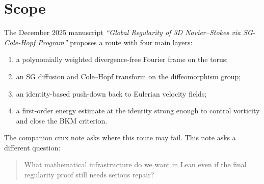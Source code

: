 \documentclass[11pt]{article}
\theoremstyle{remark}
\begin{document}
\begin{abstract}
one explicit object.  And the newest concrete step lands the D.4 chart side in
an actual finite-mode model: a squared weighted chart radius, a bounded linear
observable, the chart-cutoff datum \(W_0 = \chi \cdot \ell\), the heat datum
\(\phi = \exp(-W_0/(2\nu))\), explicit \(W_0/\phi\) bounds, and truncation
convergence for both \(W_0\) and \(\phi\) are now machine-checked in one local
module.  The latest pass then packages the first genuinely Cole--Hopf-shaped
shared truncation instance into direct named kernel and vorticity objects, so
the cutoff-convergence and uniform vorticity consequences can now be cited from
one concrete package instead of from the whole abstraction stack.  The newest
step then replaces the static selected-coefficient \(d\Phi\) surrogate by a
nonnegative-time heat-decayed one, while preserving the same shared
truncation, positivity, and coefficient-energy consequences.

This does \emph{not} prove 3D Navier--Stokes regularity.  What it does is make
the positive architecture cleaner: if the hard analytic bridges can be supplied,
the identity-energy argument now lands in a small Lean-checked interface rather
than in manuscript prose alone.
\end{abstract}

\tableofcontents

\section{Scope}

The December 2025 manuscript
\emph{``Global Regularity of 3D Navier--Stokes via SG-Cole-Hopf Program''}
proposes a route with four main layers:
\begin{enumerate}[leftmargin=1.5em]
  \item a polynomially weighted divergence-free Fourier frame on the torus;
  \item an SG diffusion and Cole--Hopf transform on the diffeomorphism group;
  \item an identity-based push-down back to Eulerian velocity fields;
  \item a first-order energy estimate at the identity strong enough to control
  vorticity and close the BKM criterion.
\end{enumerate}

The companion crux note asks where this route may fail.  This note asks a
different question:
\begin{quote}
What mathematical infrastructure do we want in Lean even if the final
regularity proof still needs serious repair?
\end{quote}
\end{document}
